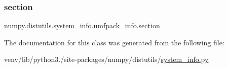 \subsubsection{\texorpdfstring{section}{section}}
{\footnotesize\ttfamily numpy.\+distutils.\+system\+\_\+info.\+umfpack\+\_\+info.\+section\hspace{0.3cm}{\ttfamily [static]}}



The documentation for this class was generated from the following file\+:\begin{DoxyCompactItemize}
\item 
venv/lib/python3./site-\/packages/numpy/distutils/\hyperlink{system__info_8py}{system\+\_\+info.\+py}\end{DoxyCompactItemize}
